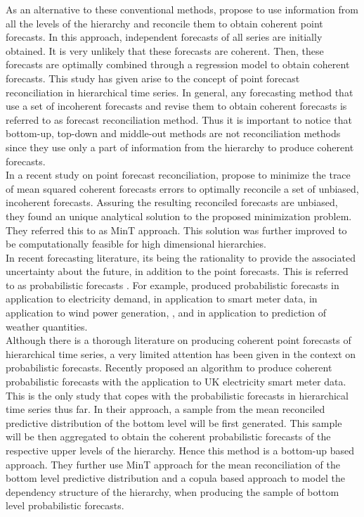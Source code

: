 \documentclass[a4paper, 11pt]{article}
\begin{document}
\noindent
As an alternative to these conventional methods, \citet{Hyndman2011} propose to use information from all the levels of the hierarchy and reconcile them to obtain coherent point forecasts. In this approach, independent forecasts of all series are initially obtained. It is very unlikely that these forecasts are coherent. Then, these forecasts are optimally combined through a regression model to obtain coherent forecasts. This study has given arise to the concept of point forecast reconciliation in hierarchical time series. In general, any forecasting method that use a set of incoherent forecasts and revise them to obtain coherent forecasts is referred to as forecast reconciliation method. Thus it is important to notice that bottom-up, top-down and middle-out methods are not reconciliation methods since they use only a part of information from the hierarchy to produce coherent forecasts. \\ 

\noindent
In a recent study on point forecast reconciliation, \citet{Wickramasuriya2017} propose to minimize the trace of mean squared coherent forecasts errors to optimally reconcile a set of unbiased, incoherent forecasts. Assuring the resulting reconciled forecasts are unbiased, they found an unique analytical solution to the proposed minimization problem. They referred this to as MinT approach. This solution was further improved to be computationally feasible for high dimensional hierarchies. \\

\noindent
In recent forecasting literature, its being the rationality to provide the associated uncertainty about the future, in addition to the point forecasts. This is referred to as probabilistic forecasts \citep{Gneiting2014}. For example, \citet{McSharry2005} produced probabilistic forecasts in application to electricity demand, \citet{BenTaieb2017} in application to smart meter data, \citet{Pinson2009} in application to wind power generation, \citet{Gel2004}, \citet{Gneiting2005a} and \citet{Gneiting2005} in application to prediction of weather quantities. \\

\noindent      
Although there is a thorough literature on producing coherent point forecasts of hierarchical time series, a very limited attention has been given in the context on probabilistic forecasts. Recently \citet{BenTaieb2017} proposed an algorithm to produce coherent probabilistic forecasts with the application to UK electricity smart meter data. This is the only study that copes with the probabilistic forecasts in hierarchical time series thus far. In their approach, a sample from the mean reconciled predictive distribution of the bottom level will be first generated. This sample will be then aggregated to obtain the coherent probabilistic forecasts of the respective upper levels of the hierarchy. Hence this method is a bottom-up based approach. They further use MinT approach for the mean reconciliation of the bottom level predictive distribution and a copula based approach to model the dependency structure of the hierarchy, when producing the sample of bottom level probabilistic forecasts.\\
\end{document}
